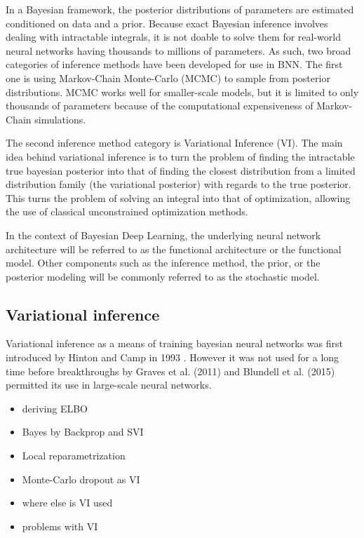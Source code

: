 	In a Bayesian framework, the posterior distributions of parameters are estimated conditioned on data and a prior. Because exact Bayesian inference involves dealing with intractable integrals, it is not doable to solve them for real-world neural networks having thousands to millions of parameters. As such, two broad categories of inference methods have been developed for use in BNN. The first one is using Markov-Chain Monte-Carlo (MCMC) to sample from posterior distributions. MCMC works well for smaller-scale models, but it is limited to only thousands of parameters because of the computational expensiveness of Markov-Chain simulations. 
	
	The second inference method category is Variational Inference (VI). The main idea behind variational inference is to turn the problem of finding the intractable true bayesian posterior into that of finding the closest distribution from a limited distribution family (the variational posterior) with regards to the true posterior. This turns the problem of solving an integral into that of optimization, allowing the use of classical unconstrained optimization methods. 
	
	In the context of Bayesian Deep Learning, the underlying neural network architecture will be referred to as the functional architecture or the functional model. Other components such as the inference method, the prior,  or the posterior modeling will be commonly referred to as the stochastic model. 
	
	

\subsection{Variational inference}
\label{section:vi}


	Variational inference as a means of training bayesian neural networks was first introduced by Hinton and Camp in 1993 \cite{hinton_keeping_1993}. However it was not used for a long time before breakthroughs by Graves et al. (2011) \cite{graves_practical_2011} and Blundell et al. (2015) \cite{blundell_weight_2015} permitted its use in large-scale neural networks. 
	
	 

	\begin{itemize}
		\item deriving ELBO
		
		
		\item Bayes by Backprop and SVI
		\item Local reparametrization
		\item Monte-Carlo dropout as VI
		\item where else is VI used
		\item problems with VI
	\end{itemize}

